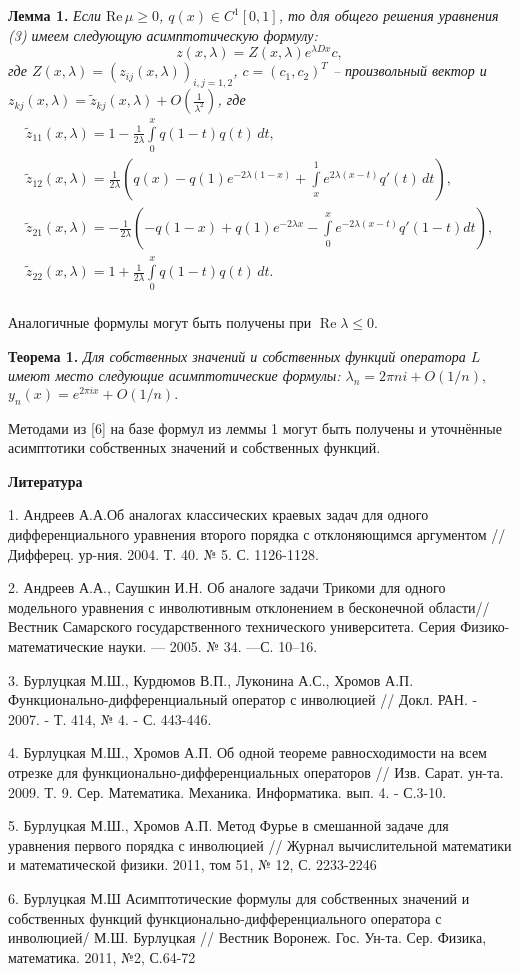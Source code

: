 \textbf{Лемма 1.} {\it Если $\mathrm{Re\,} \mu \geqslant 0$,  $q (x)\in
C^1[0,1]$, то для общего решения уравнения (3) имеем следующую
асимптотическую формулу:
$$ z(x, \lambda )=Z(x,  \lambda) e^{\lambda  {D}x}c, $$
где $ Z(x,  \lambda)= (z_{ij}(x,  \lambda))_{i,j=1,2}$,  $c=(c_1,
c_2)^T$ -- произвольный вектор и $z_{kj}(x,
\lambda)=\widetilde{z}_{kj}(x,\lambda)+ O\left( \frac1{ \lambda^2}
\right)$, где
$$\begin{array}{l} \widetilde{z}_{11}(x, \lambda)=1 -\frac1{2 \lambda}\int\limits_0^x q(1-t) q(t)\, dt, \\
\widetilde{z}_{12}(x, \lambda)=\frac1{2 \lambda}\left(q(x)- q(1)
e^{-2\lambda (1- x)}+ \int\limits_x^1 e^{2\lambda (x- t)} q'(t)\,
dt\right)\!,\\
 \widetilde{z}_{21}(x, \lambda)= {-}\frac1{2 \lambda}\!\left({-}q(1{-}x){+}q(1)
e^{-2\lambda  x}{-}\int\limits_0^x e^{-2\lambda (x{-}t)} q'(1{-}t)  dt\right)\!\!,\\
%
\widetilde{z}_{22}(x, \lambda)=1 +\frac1{2 \lambda}\int\limits_0^x
q(1-t) q(t)\, dt. \end{array}$$} \\
Аналогичные
формулы могут быть получены при $\operatorname{Re}\lambda \leqslant 0$.

\textbf{Теорема 1.} {\it Для собственных значений и собственных
функций оператора $L$ имеют место следующие асимптотические формулы:
${{\lambda }_{n}}=2\pi ni+O(1/n),$ ${{y}_{n}}\left( x
\right)={{e}^{2\pi ix}}+O(1/n).$}

Методами из [6] на базе формул из леммы 1  могут быть получены и
уточнённые асимптотики собственных значений и собственных функций.

\smallskip \centerline{\bf Литература}\nopagebreak

1. Андреев А.А.Об аналогах классических краевых задач для одного
дифференциального уравнения второго порядка с отклоняющимся
аргументом // Дифферец. ур-ния. 2004. Т. 40. № 5. С. 1126-1128.

2. Андреев  А.А., Саушкин И.Н. Об аналоге задачи Трикоми для одного
модельного уравнения с инволютивным отклонением в бесконечной
области// Вестник Самарского государственного технического
университета. Серия Физико-математические науки. --- 2005. № 34.
---С. 10--16.

3. Бурлуцкая М.Ш., Курдюмов В.П.,  Луконина А.С.,  Хромов А.П.
Функционально-дифференциальный оператор с инволюцией  // Докл. РАН.
- 2007. - Т. 414, № 4. - С. 443-446.

4. Бурлуцкая М.Ш., Хромов А.П.  Об одной теореме равносходимости  на
всем отрезке для функционально-диффе\-рен\-циаль\-ных операторов //
Изв. Сарат. ун-та. 2009. Т. 9. Сер. Математика. Механика.
Информатика. вып. 4. - С.3-10.

5. Бурлуцкая М.Ш., Хромов А.П. Метод Фурье в  смешанной задаче для
уравнения первого порядка   с инволюцией // Журнал вычислительной
математики и математической физики. 2011, том 51, № 12, С. 2233-2246

6. Бурлуцкая М.Ш Асимптотические формулы для собственных значений и
собственных функций функционально-дифференциального оператора с
инволюцией/ М.Ш. Бурлуцкая // Вестник Воронеж. Гос. Ун-та. Сер.
Физика, математика. 2011, №2, С.64-72

